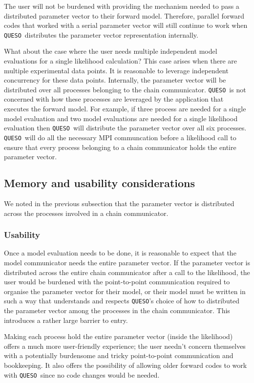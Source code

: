 \documentclass{article}
\newcommand{\Queso}{\texttt{QUESO}}
\begin{document}
The user will not be burdened with providing the mechanism needed to pass a
distributed parameter vector to their forward model.  Therefore, parallel
forward codes that worked with a serial parameter vector will still continue to
work when \Queso\ distributes the parameter vector representation internally.

What about the case where the user needs multiple independent model evaluations
for a single likelihood calculation?  This case arises when there are multiple
experimental data points.  It is reasonable to leverage independent concurrency
for these data points.  Internally, the parameter vector will be distributed
over all processes belonging to the chain communicator. \Queso\ is not
concerned with how these processes are leveraged by the application that
executes the forward model.  For example, if three process are needed for a
single model evaluation and two model evaluations are needed for a single
likelihood evaluation then \Queso\ will distribute the parameter vector over
all six processes.  \Queso\ will do all the necessary MPI communcation before a
likelihood call to ensure that every process belonging to a chain communicator
holds the entire parameter vector.

\subsection{Memory and usability considerations}

We noted in the previous subsection that the parameter vector is distributed
across the processes involved in a chain communicator.

\subsubsection{Usability}

Once a model evaluation needs to be done, it is reasonable to expect that the
model communicator needs the entire parameter vector.  If the parameter vector
is distributed across the entire chain communicator after a call to the
likelihood, the user would be burdened with the point-to-point communication
required to organise the parameter vector for their model, or their model must
be written in such a way that understands and respects \Queso's choice of how
to distributed the parameter vector among the processes in the chain communicator.
This introduces a rather large barrier to entry.

Making each process hold the entire parameter vector (inside the likelihood)
offers a much more user-friendly experience; the user needn't concern
themselves with a potentially burdensome and tricky point-to-point
communication and bookkeeping.  It also offers the possibility of allowing
older forward codes to work with \Queso\ since no code changes would be needed.
\end{document}
